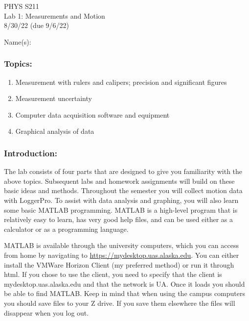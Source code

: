 \documentclass[11pt,letterpaper]{article}
\begin{document}
\setlength{\parindent}{0in}

\begin{flushright}
PHYS S211\\
Lab 1: Measurements and Motion\\
8/30/22 (due 9/6/22)
\end{flushright}

Name(s):\\


\subsubsection*{Topics:}
\begin{enumerate}
\setlength{\parskip}{3pt}
\item Measurement with rulers and calipers; precision and significant figures
\item Measurement uncertainty
\item Computer data acquisition software and equipment
\item Graphical analysis of data
\end{enumerate}

\subsubsection*{Introduction:}
The lab consists of four parts that are designed to give you familiarity with the above topics. Subsequent labs and homework assignments will build on these basic ideas and methods. Throughout the semester you will collect motion data with LoggerPro. To assist with data analysis and graphing, you will also learn some basic MATLAB programming. MATLAB is a high-level program that is relatively easy to learn, has very good help files, and can be used either as a calculator or as a programming language. 

MATLAB is available through the university computers, which you can access from home by navigating to \url{https://mydesktop.uas.alaska.edu}. You can either install the VMWare Horizon Client (my preferred method) or run it through html. If you chose to use the client, you need to specify that the client is mydesktop.uas.alaska.edu and that the network is UA. Once it loads you should be able to find MATLAB. Keep in mind that when using the campus computers you should save files to your Z drive. If you save them elsewhere the files will disappear when you log out.
\end{document}
